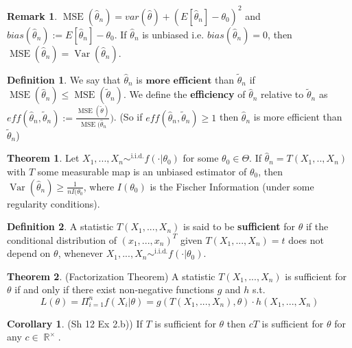 \documentclass[11pt]{article}
\theoremstyle{definition}
\DeclareMathOperator{\iid}{i.i.d.}
\DeclareMathOperator{\var}{Var}
\DeclareMathOperator{\R}{\mathbb{R}}
\DeclareMathOperator{\mse}{MSE}
\newcommand{\est}{\hat{\theta}}
\newcommand{\estt}{\tilde{\theta}}
\newtheorem{thm}{Theorem}
\newtheorem{cor}{Corollary}
\newtheorem{defn}{Definition}
\newtheorem{rem}{Remark}
\begin{document}
\begin{rem}
$\mse(\est_n)=var(\est)+(E[\est_n]-\theta_0)^2$ and $bias(\est_n):=E[\est_n]-\theta_0$. If $\est_n$ is unbiased i.e. $bias(\est_n)=0$, then $\mse(\est_n)=\var(\est_n)$.
\end{rem}

\begin{defn}
We say that $\est_n$ is $\textbf{more efficient}$ than $\tilde{\theta}_n$ if $\mse(\est_n)\leq\mse(\tilde{\theta}_n)$. We define the \textbf{efficiency} of $\est_n$ relative to $\estt_n$ as $eff(\est_n,\estt_n):=\frac{\mse(\estt)}{\mse(\est_n})$. (So if $eff(\est_n,\estt_n)\geq 1$ then $\est_n$ is more efficient than $\estt_n$)
\end{defn}

\begin{thm}
Let $X_1,...,X_n\sim^{\iid} f(\cdot|\theta_0)$ for some $\theta_0\in\Theta$. If $\est_n=T(X_1,..,X_n)$ with $T$ some measurable map is an unbiased estimator of $\theta_0$, then $\var(\est_n)\geq\frac{1}{nI(\theta_0}$, where $I(\theta_0)$ is the Fischer Information (under some regularity conditions).
\end{thm}

\begin{defn}
A statistic $T(X_1,...,X_n)$ is said to be \textbf{sufficient} for $\theta$ if the conditional distribution of $(x_1,...,x_n)^T$ given $T(X_1,...,X_n)=t$ does not depend on $\theta$, whenever $X_1,...,X_n\sim^{\iid} f(\cdot|\theta_0)$.
\end{defn}

\begin{thm}(Factorization Theorem) A statistic $T(X_1,...,X_n)$ is sufficient for $\theta$ if and only if there exist non-negative functions $g$ and $h$ s.t.
\[L(\theta)=\Pi^n_{i=1}f(X_i|\theta)=g(T(X_1,...,X_n),\theta)\cdot  h(X_1,...,X_n)\]
\end{thm}

\begin{cor}(Sh 12 Ex 2.b)) If $T$ is sufficient for $\theta$ then $cT$ is sufficient for $\theta$ for any $c\in\R^\times$.
\end{cor}
\end{document}
